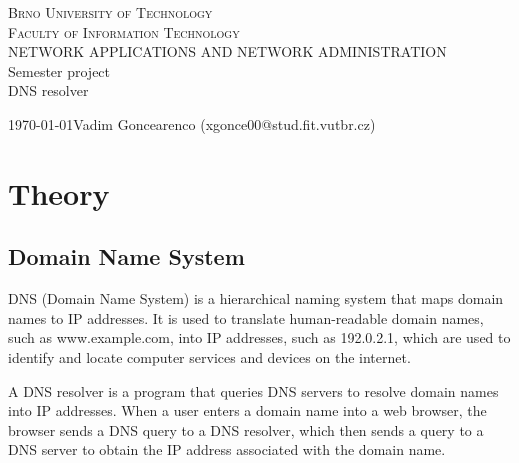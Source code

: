 \documentclass[a4paper, 11pt]{article}
\begin{document}
\begin{center}
    \Huge
    \textsc{Brno University of Technology\\\huge Faculty of Information Technology}\\
    \LARGE
    NETWORK APPLICATIONS AND NETWORK ADMINISTRATION\\\LARGE 
    Semester project\\\Huge
    \Huge DNS resolver\\
\end{center}
{\Large \today \hfill Vadim Goncearenco (xgonce00@stud.fit.vutbr.cz)}
\newpage

\tableofcontents
\newpage



\newcommand{\todo}[1]{\textcolor{orange}{\textbf{[[#1]]}}}
\newcommand{\desc}[1]{\textcolor{gray}{\textbf{[[#1]]}}}


\section{Theory}
    \subsection{Domain Name System}
        DNS (Domain Name System) is a hierarchical naming system that maps domain names to IP addresses.
        It is used to translate human-readable domain names, such as www.example.com, into IP addresses, such as 192.0.2.1, 
        which are used to identify and locate computer services and devices on the internet.\cite{1987}

        A DNS resolver is a program that queries DNS servers to resolve domain names into IP addresses.
        When a user enters a domain name into a web browser, the browser sends a DNS query to a DNS resolver, 
        which then sends a query to a DNS server to obtain the IP address associated with the domain name.
\end{document}
